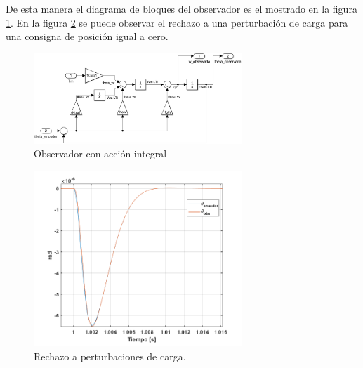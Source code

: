 \documentclass[10pt]{article}
\begin{document}
\begin{itemize}
	De esta manera el diagrama de bloques del observador es el mostrado en la figura \ref{fig:observadornuevo}. En la figura \ref{fig:obs} se puede observar el rechazo a una perturbación de carga para una consigna de posición igual a cero.\\
	\begin{figure}[h!]
		\centering
		\includegraphics[width=0.7\textwidth]{observadornuevo.png}
		\caption{\label{fig:observadornuevo}Observador con acción integral}
		\end{figure}
	
	\begin{figure}[h!]
		\centering
		\includegraphics[width=0.7\textwidth]{obs.png}
		\caption{\label{fig:obs}Rechazo a perturbaciones de carga.}
		\end{figure}


\end{itemize}
\end{document}
